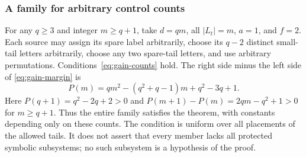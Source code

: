 \documentclass[11pt,reqno]{amsart}
\numberwithin{equation}{section}
\theoremstyle{definition}
\theoremstyle{definition}
\begin{document}
\subsubsection{A family for arbitrary control counts}
For any $q\ge3$ and integer $m\ge q+1$, take $d=qm$,
all $|L_t|=m$, $a=1$, and $f=2$. Each source may assign
its spare label arbitrarily, choose its $q-2$ distinct small-tail
letters arbitrarily, choose any two spare-tail letters, and use
arbitrary permutations. Conditions~\eqref{eq:gain-counts} hold.
The right side minus the left side of \eqref{eq:gain-margin} is
\[
 P(m)=qm^2-(q^2+q-1)m+q^2-3q+1.
\]
Here $P(q+1)=q^2-2q+2>0$ and
$P(m+1)-P(m)=2qm-q^2+1>0$ for $m\ge q+1$.
Thus the entire family satisfies the theorem, with constants
depending only on these counts. The condition is uniform over all placements of the allowed tails.
It does not assert that every member lacks all protected symbolic
subsystems; no such subsystem is a hypothesis of the proof.
\end{document}
